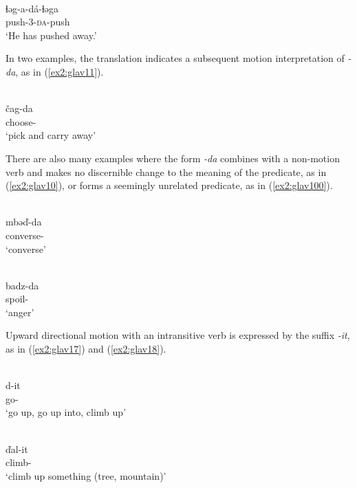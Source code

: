 \ea\label{ex2:glav1}
 \\
\gll ɬəg-a-dá-ɬəga\\
push-3-\textsc{da}-push \\
\glt `He has pushed away.'
\z

In two examples, the translation indicates a subsequent motion interpretation of \textit{-da}, as in (\ref{ex2:glav11}). 

\ea\label{ex2:glav11}
 \\
\gll čag-da	\\ 
choose-	\\
\glt `pick and carry away'
\z 

There are also many examples where the form \textit{-da} combines with a non-motion verb and makes no discernible change to the meaning of the predicate, as in (\ref{ex2:glav10}), or forms a seemingly unrelated predicate, as in (\ref{ex2:glav100}). 

\ea\label{ex2:glav10}
 \\
\gll mbəď-da	 \\
converse-	 \\
\glt `converse'

\ex\label{ex2:glav100}
 \\
badz-da	\\
spoil- \\
\glt `anger'
\z 

Upward directional motion with an intransitive verb is expressed by the suffix \textit{-it}, as in (\ref{ex2:glav17}) and (\ref{ex2:glav18}). 

\ea\label{ex2:glav17}
 \\
\gll d-it	\\
go- \\
\glt `go up, go up into, climb up'

\ex\label{ex2:glav18}
 \\
\gll ďal-it	\\
climb-		\\
\glt `climb up something (tree, mountain)'
\z

